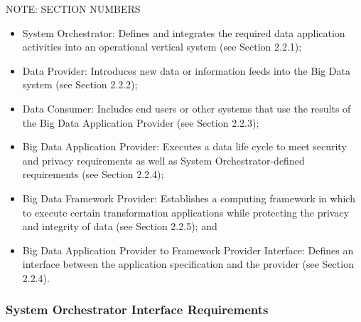 \documentclass[9pt,]{article}
\newenvironment{Shaded}{}{}
\newcommand{\ExtensionTok}[1]{#1}
\newcommand{\NormalTok}[1]{#1}
\providecommand{\tightlist}{%
  \setlength{\itemsep}{0pt}\setlength{\parskip}{0pt}}
\begin{document}
\begin{Shaded}
\begin{Highlighting}[]
\ExtensionTok{NOTE}\NormalTok{: SECTION NUMBERS}
\end{Highlighting}
\end{Shaded}

\begin{itemize}
\tightlist
\item
  System Orchestrator: Defines and integrates the required data
  application activities into an operational vertical system (see
  Section 2.2.1);
\item
  Data Provider: Introduces new data or information feeds into the Big
  Data system (see Section 2.2.2);
\item
  Data Consumer: Includes end users or other systems that use the
  results of the Big Data Application Provider (see Section 2.2.3);
\item
  Big Data Application Provider: Executes a data life cycle to meet
  security and privacy requirements as well as System
  Orchestrator-defined requirements (see Section 2.2.4);
\item
  Big Data Framework Provider: Establishes a computing framework in
  which to execute certain transformation applications while protecting
  the privacy and integrity of data (see Section 2.2.5); and
\item
  Big Data Application Provider to Framework Provider Interface: Defines
  an interface between the application specification and the provider
  (see Section 2.2.4).
\end{itemize}

\hypertarget{system-orchestrator-interface-requirements}{%
\subsubsection{System Orchestrator Interface
Requirements}\label{system-orchestrator-interface-requirements}}
\end{document}
